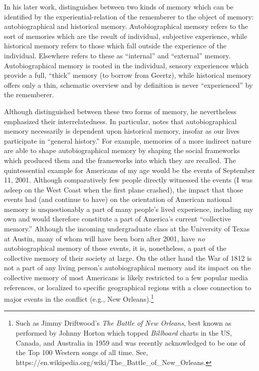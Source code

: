 In his later work, \halbwachs distinguishes between two kinds of memory which can be identified by the experiential-relation of the rememberer to the object of memory: autobiographical and historical memory.\autocite[52]{halbwachs1980} Autobiographical memory refers to the sort of memories which are the result of individual, subjective experience, while historical memory refers to those which fall outside the experience of the individual. Elsewhere \halbwachs refers to these as ``internal'' and ``external'' memory. Autobiographical memory is rooted in the individual, sensory experiences which provide a full, ``thick'' memory (to borrow from Geertz), while historical memory offers only a thin, schematic overview and by definition is never ``experienced'' by the rememberer.  

Although \halbwachs distinguished between these two forms of memory, he nevertheless emphasized their interrelatedness. In particular, \halbwachs notes that autobiographical memory necessarily is dependent upon historical memory, insofar as our lives participate in ``general history.''\autocite[52]{halbwachs1980} For example, memories of a more indirect nature are able to shape autobiographical memory by shaping the social frameworks which produced them and the frameworks into which they are recalled. The quintessential example for Americans of my age would be the events of September 11, 2001. Although comparatively few people directly witnessed the events (I was asleep on the West Coast when the first plane crashed), the impact that those events had (and continue to have) on the orientation of American national memory is unquestionably a part of many people's lived experience, including my own and would therefore constitute a part of America's current ``collective memory.'' Although the incoming undergraduate class at the University of Texas at Austin, many of whom will have been born after 2001, have \emph{no} autobiographical memory of these events, it is, nonetheless, a part of the collective memory of their society at large. On the other hand the War of 1812 is not a part of any living person's autobiographical memory and its impact on the collective memory of most Americans is likely restricted to a few popular media references, or localized to specific geographical regions with a close connection to major events in the conflict (e.g., New Orleans).\footnote{Such as Jimmy Driftwood's \emph{The Battle of New   Orleans}, best known as performed by Johnny Horton which topped   \emph{Billboard} charts in the US, Canada, and Australia in 1959 and   was recently acknowledged to be one of the Top 100 Western songs of   all time. See,   https://en.wikipedia.org/wiki/The\_Battle\_of\_New\_Orleans.}  

